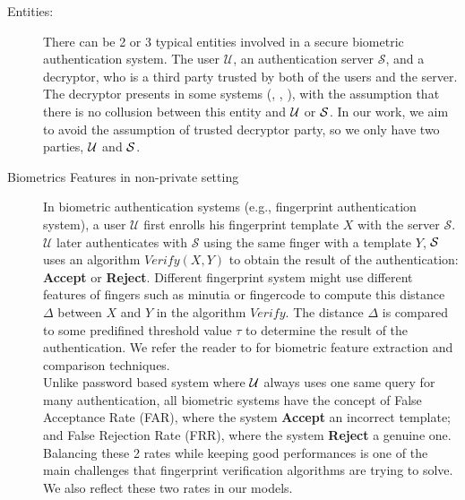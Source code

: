 \begin{description}
\item[Entities:] There can be 2 or 3 typical entities involved in a secure biometric authentication system. The user
  $\mathcal{U}$, an authentication server $\mathcal{S}$, and a decryptor, who is a third party trusted by both of the
  users and the server. The decryptor presents in some systems (\cite{mandal2015comprehensive},
  \cite{hirano2013cryptographically}, \cite{higo2015privacy}), with the assumption that there is no collusion between
  this entity and $\mathcal{U}$ or $\mathcal{S}$. In our work, we aim to avoid the assumption of trusted decryptor party, so we
  only have two parties, $\mathcal{U}$ and $\mathcal{S}$.
\item[Biometrics Features in non-private setting] In biometric authentication systems (e.g., fingerprint authentication
  system), a user $\mathcal{U}$ first
  enrolls his fingerprint template $X$ with the server $\mathcal{S}$. $\mathcal{U}$ later authenticates with
  $\mathcal{S}$ using the same finger with a template $Y$, $\mathcal{S}$ uses an algorithm $Verify(X,Y)$ to obtain the
  result of the authentication: \textbf{Accept} or \textbf{Reject}. Different fingerprint system might use different
  features of fingers such as minutia or fingercode to compute this distance $\Delta$ between $X$ and $Y$ in the
  algorithm $Verify$. The distance $\Delta$ is compared to some predifined threshold value $\tau$ to determine the
  result of the authentication. We refer the reader to \cite{jain2007handbook} for biometric feature extraction and
  comparison techniques.\\

  Unlike password based system where $\mathcal{U}$ always uses one same query for many authentication, all biometric systems
  have the concept of False Acceptance Rate (FAR), where the system \textbf{Accept} an incorrect template; and False
  Rejection Rate (FRR), where the system \textbf{Reject} a genuine one.  Balancing these 2 rates while keeping good
  performances is one of the main challenges that fingerprint verification algorithms \cite{FVConGoi2:online} are trying
  to solve. We also reflect these two rates in our models.


\end{description}
